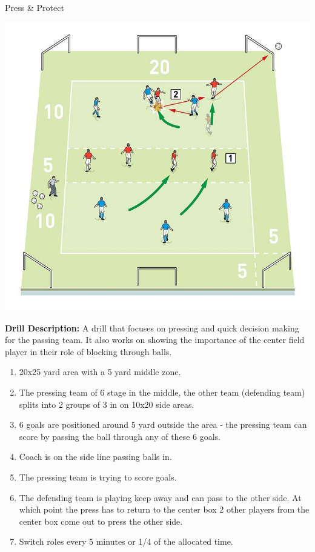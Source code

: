 \begin{evenBlock}{Press \& Protect}
\begin{minipage}[t]{\linewidth}
\begin{minipage}{.4\linewidth}
        \includegraphics[width=\textwidth]{../img/Trimmed/Press_Protect_2}
    \end{minipage}
    \hspace{0.05\linewidth}
    \begin{minipage}{.5\linewidth} %
        \textbf{Drill Description:}
        A drill that focuses on pressing and quick decision making for the passing team.  It also works on showing the importance of the center field player in their role of blocking through balls.
        
        \begin{enumerate}
        \setlength{\itemsep}{0pt}
        \setlength{\parskip}{0pt}
        \setlength{\parsep}{0pt}
        \item 20x25 yard area with a 5 yard middle zone.
        \item The pressing team of 6 stage in the middle, the other team (defending team) splits into 2 groups of 3 in on 10x20 side areas.
        \item 6 goals are positioned around 5 yard outside the area - the pressing team can score by passing the ball through any of these 6 goals.
        \item Coach is on the side line passing balls in.
        \item The pressing team is trying to score goals.
        \item The defending team is playing keep away and can pass to the other side.  At which point the press has to return to the center box 2 other players from the center box come out to press the other side.
        \item Switch roles every 5 minutes or 1/4 of the allocated time.
        \end{enumerate}


\end{minipage}
\end{minipage}
\end{evenBlock}
